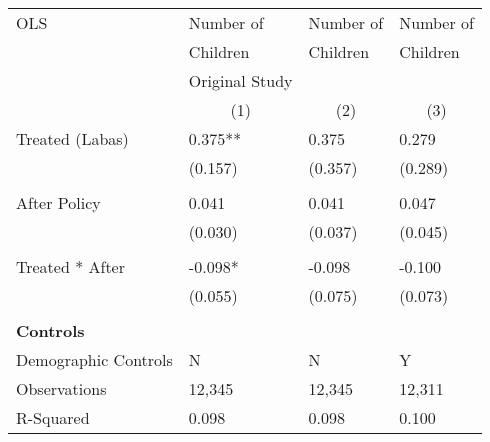 \begin{tabular}{p{4cm}p{1.5cm}p{1.5cm}p{1.5cm}}
\hline\hline
OLS               &Number of & Number of &Number of \\
&Children & Children & Children\\
&Original Study & &  \\
&\multicolumn{1}{c}{(1)}&\multicolumn{1}{c}{(2)}&\multicolumn{1}{c}{(3)}\\
\hline
Treated (Labas)   &  0.375**&   0.375 & 0.279 \\
                &  (0.157)&  (0.357) & (0.289)\\
                \\
After Policy   &   0.041&   0.041 &0.047\\
                &  (0.030)&  (0.037) & (0.045)\\
                \\
Treated * After   & -0.098*&  -0.098 & -0.100\\
                &  (0.055)&  (0.075) &(0.073)\\
                \\

\multicolumn{6}{l}{\textbf{Controls}}  \\                  
Demographic Controls       &   N     &        N&        Y\\

\hline
Observations    &    12,345&    12,345 & 12,311\\
R-Squared    &  0.098   & 0.098 & 0.100     \\
\hline\hline
\end{tabular}